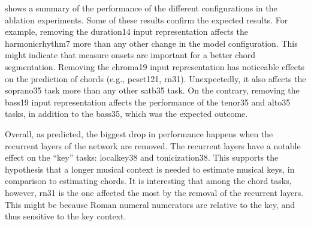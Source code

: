 

 shows a summary of the performance of the
different configurations in the ablation experiments. Some
of these results confirm the expected results. For example,
removing the \gls{duration14} input representation affects
the \gls{harmonicrhythm7} more than any other change in the
model configuration. This might indicate that measure onsets
are important for a better chord segmentation. Removing the
\gls{chroma19} input representation has noticeable effects
on the prediction of chords (e.g., \gls{pcset121},
\gls{rn31}). Unexpectedly, it also affects the
\gls{soprano35} task more than any other \gls{satb35} task.
On the contrary, removing the \gls{bass19} input
representation affects the performance of the \gls{tenor35}
and \gls{alto35} tasks, in addition to the \gls{bass35},
which was the expected outcome.

Overall, as predicted, the biggest drop in performance
happens when the recurrent layers of the network are
removed. The recurrent layers have a notable effect on the
``key'' tasks: \gls{localkey38} and \gls{tonicization38}.
This supports the hypothesis that a longer musical context
is needed to estimate musical keys, in comparison to
estimating chords. It is interesting that among the chord
tasks, however, \gls{rn31} is the one affected the most by
the removal of the recurrent layers. This might be because
Roman numeral numerators are relative to the key, and thus
sensitive to the key context.

